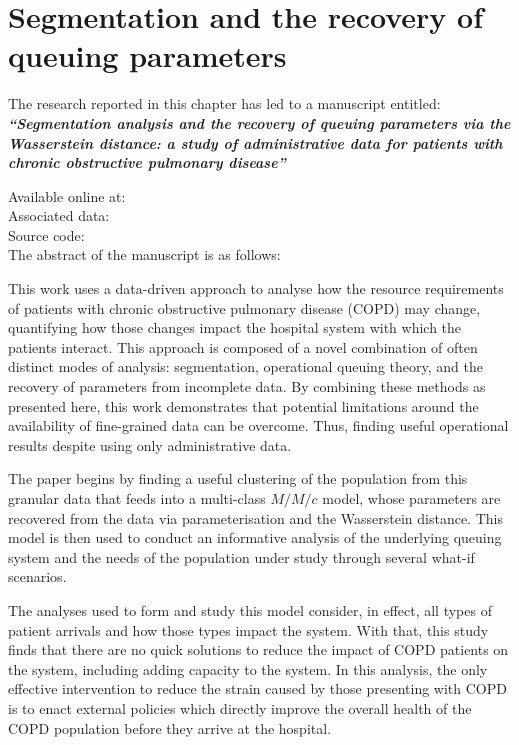 \chapter{Segmentation and the recovery of queuing parameters}

\graphicspath{{chapters/copd/paper/img/}}
\renewcommand{\texpath}{chapters/copd/paper/tex}

\begin{center}
    The research reported in this chapter has led to a manuscript
    entitled:\\[1em]

    {%
        \bf\itshape{``Segmentation analysis and the recovery of queuing
                    parameters via the Wasserstein distance: a study of
                    administrative data for patients with chronic obstructive
                    pulmonary disease''}
    }

    Available online at: \\
    Associated data: \\
    Source code: \\[2em]

    The abstract of the manuscript is as follows:\\[1em]
\end{center}

This work uses a data-driven approach to analyse how the resource requirements
of patients with chronic obstructive pulmonary disease (COPD) may change,
quantifying how those changes impact the hospital system with which the patients
interact. This approach is composed of a novel combination of often distinct
modes of analysis: segmentation, operational queuing theory, and the recovery of
parameters from incomplete data. By combining these methods as presented here,
this work demonstrates that potential limitations around the availability of
fine-grained data can be overcome. Thus, finding useful operational results
despite using only administrative data.

The paper begins by finding a useful clustering of the population from this
granular data that feeds into a multi-class \(M/M/c\) model, whose parameters
are recovered from the data via parameterisation and the Wasserstein distance.
This model is then used to conduct an informative analysis of the underlying
queuing system and the needs of the population under study through several
what-if scenarios.

The analyses used to form and study this model consider, in effect, all types of
patient arrivals and how those types impact the system. With that, this study
finds that there are no quick solutions to reduce the impact of COPD patients on
the system, including adding capacity to the system. In this analysis, the only
effective intervention to reduce the strain caused by those presenting with COPD
is to enact external policies which directly improve the overall health of the
COPD population before they arrive at the hospital.

